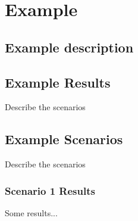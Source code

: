 \section{Example}


\subsection{Example description}







\subsection{Example Results}

Describe the scenarios

\subsection{Example Scenarios}

Describe the scenarios



\subsubsection{Scenario 1 Results}

Some results...


